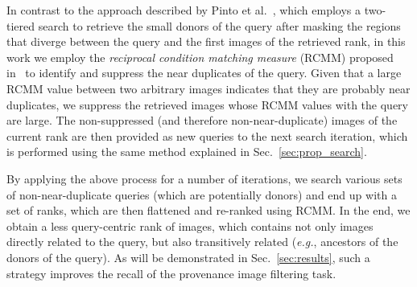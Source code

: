 In contrast to the approach described by Pinto et al.~\cite{pinto2017filtering}, which employs a two-tiered search to retrieve the small donors of the query after masking the regions that diverge between the query and the first images of the retrieved rank, in this work we employ the \emph{reciprocal condition matching measure} (RCMM) proposed in~\cite{brogan2017spotting} to identify and suppress the near duplicates of the query.
Given that a large RCMM value between two arbitrary images indicates that they are probably near duplicates, we suppress the retrieved images whose RCMM values with the query are large.
The non-suppressed (and therefore non-near-duplicate) images of the current rank are then provided as new queries to the next search iteration, which is performed using the same method explained in Sec.~\ref{sec:prop_search}.


By applying the above process for a number of iterations, we search various sets of non-near-duplicate queries (which are potentially donors) and end up with a set of ranks, which are then flattened and re-ranked using RCMM.
In the end, we obtain a less query-centric rank of images, which contains not only images directly related to the query, but also transitively related (\textit{e.g.}, ancestors of the donors of the query).
As will be demonstrated in Sec.~\ref{sec:results}, such a strategy improves the recall of the provenance image filtering task.

